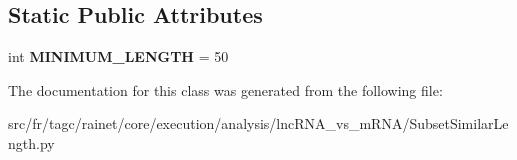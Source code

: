 \subsection*{Static Public Attributes}
\begin{DoxyCompactItemize}
\item 
\hypertarget{classsrc_1_1fr_1_1tagc_1_1rainet_1_1core_1_1execution_1_1analysis_1_1lncRNA__vs__mRNA_1_1SubsetS533a3a1e4aeb7ed6941cfae512e8909f_a765316e011e651f78ec1f28c990461c5}{int {\bfseries M\-I\-N\-I\-M\-U\-M\-\_\-\-L\-E\-N\-G\-T\-H} = 50}\label{classsrc_1_1fr_1_1tagc_1_1rainet_1_1core_1_1execution_1_1analysis_1_1lncRNA__vs__mRNA_1_1SubsetS533a3a1e4aeb7ed6941cfae512e8909f_a765316e011e651f78ec1f28c990461c5}

\end{DoxyCompactItemize}


The documentation for this class was generated from the following file\-:\begin{DoxyCompactItemize}
\item 
src/fr/tagc/rainet/core/execution/analysis/lnc\-R\-N\-A\-\_\-vs\-\_\-m\-R\-N\-A/Subset\-Similar\-Length.\-py\end{DoxyCompactItemize}
